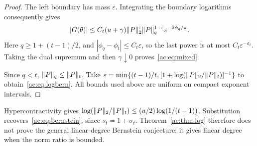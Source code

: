\begin{proof}
The left boundary has mass $\varepsilon$. Integrating the boundary logarithms consequently gives
\[
 |G(\theta)|\le C_t(u+\gamma)
 \lVert P\rVert_{2}^\varepsilon\lVert P\rVert_{q}^{1-\varepsilon}
 \varepsilon^{-2\phi_q/\pi}.
\]
Here $q\ge1+(t-1)/2$, and $|\phi_q-\phi_t|\le C_t\varepsilon$, so the last power is at most $C_t\varepsilon^{-\sigma_t}$. Taking the dual supremum and then $\gamma\downarrow0$ proves~\eqref{ac:eq:mixed}.

Since $q<t$, $\lVert P\rVert_{q}\le\lVert P\rVert_{t}$. Take
$\varepsilon=\min\{(t-1)/t,[1+\log(\lVert P\rVert_{2}/\lVert P\rVert_{t})]^{-1}\}$ to obtain~\eqref{ac:eq:logbern}. All bounds used above are uniform on compact exponent intervals.
\end{proof}

Hypercontractivity gives $\log(\lVert P\rVert_{2}/\lVert P\rVert_{t})\le(u/2)\log(1/(t-1))$. Substitution recovers~\eqref{ac:eq:bernstein}, since $s_t=1+\sigma_t$. Theorem~\ref{ac:thm:log} therefore does not prove the general linear-degree Bernstein conjecture; it gives linear degree when the norm ratio is bounded.

